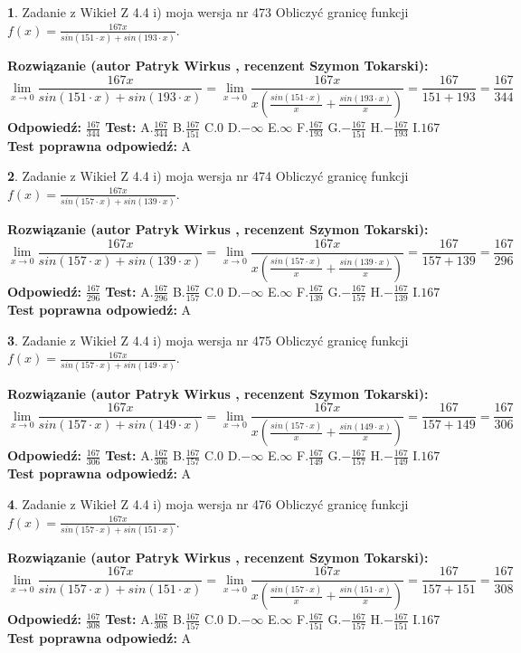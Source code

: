 \documentclass[12pt, a4paper]{article}
\theoremstyle{definition} %
\newtheorem{zad}{}
\newcommand{\zadStart}[1]{\begin{zad}#1\newline}
\newcommand{\zadStop}{\end{zad}}
\newcommand{\rozwStart}[2]{\noindent \textbf{Rozwiązanie (autor #1 , recenzent #2): }\newline}
\newcommand{\rozwStop}{\newline}
\newcommand{\odpStart}{\noindent \textbf{Odpowiedź:}\newline}
\newcommand{\odpStop}{\newline}
\newcommand{\testStart}{\noindent \textbf{Test:}\newline}
\newcommand{\testStop}{\newline}
\newcommand{\kluczStart}{\noindent \textbf{Test poprawna odpowiedź:}\newline}
\newcommand{\kluczStop}{\newline}
\begin{document}
\zadStart{Zadanie z Wikieł Z 4.4 i) moja wersja nr 473}
Obliczyć granicę funkcji $f(x)=\frac{167x}{sin(151\cdot x) +sin(193\cdot x)}$.
\zadStop
\rozwStart{Patryk Wirkus}{Szymon Tokarski}
$$\lim\limits_{x\to 0}\frac{167x}{sin(151\cdot x) +sin(193\cdot x)}=\lim\limits_{x\to 0}\frac{167x}{x(\frac{sin(151\cdot x)}{x}+\frac{sin(193\cdot x)}{x})}=\frac{167}{151+193} = \frac{167}{344}$$
\rozwStop
\odpStart
$\frac{167}{344}$
\odpStop
\testStart
A.$\frac{167}{344}$
B.$\frac{167}{151}$
C.$0$
D.$-\infty$
E.$\infty$
F.$\frac{167}{193}$
G.$-\frac{167}{151}$
H.$-\frac{167}{193}$
I.$167$
\testStop
\kluczStart
A
\kluczStop



\zadStart{Zadanie z Wikieł Z 4.4 i) moja wersja nr 474}
Obliczyć granicę funkcji $f(x)=\frac{167x}{sin(157\cdot x) +sin(139\cdot x)}$.
\zadStop
\rozwStart{Patryk Wirkus}{Szymon Tokarski}
$$\lim\limits_{x\to 0}\frac{167x}{sin(157\cdot x) +sin(139\cdot x)}=\lim\limits_{x\to 0}\frac{167x}{x(\frac{sin(157\cdot x)}{x}+\frac{sin(139\cdot x)}{x})}=\frac{167}{157+139} = \frac{167}{296}$$
\rozwStop
\odpStart
$\frac{167}{296}$
\odpStop
\testStart
A.$\frac{167}{296}$
B.$\frac{167}{157}$
C.$0$
D.$-\infty$
E.$\infty$
F.$\frac{167}{139}$
G.$-\frac{167}{157}$
H.$-\frac{167}{139}$
I.$167$
\testStop
\kluczStart
A
\kluczStop



\zadStart{Zadanie z Wikieł Z 4.4 i) moja wersja nr 475}
Obliczyć granicę funkcji $f(x)=\frac{167x}{sin(157\cdot x) +sin(149\cdot x)}$.
\zadStop
\rozwStart{Patryk Wirkus}{Szymon Tokarski}
$$\lim\limits_{x\to 0}\frac{167x}{sin(157\cdot x) +sin(149\cdot x)}=\lim\limits_{x\to 0}\frac{167x}{x(\frac{sin(157\cdot x)}{x}+\frac{sin(149\cdot x)}{x})}=\frac{167}{157+149} = \frac{167}{306}$$
\rozwStop
\odpStart
$\frac{167}{306}$
\odpStop
\testStart
A.$\frac{167}{306}$
B.$\frac{167}{157}$
C.$0$
D.$-\infty$
E.$\infty$
F.$\frac{167}{149}$
G.$-\frac{167}{157}$
H.$-\frac{167}{149}$
I.$167$
\testStop
\kluczStart
A
\kluczStop



\zadStart{Zadanie z Wikieł Z 4.4 i) moja wersja nr 476}
Obliczyć granicę funkcji $f(x)=\frac{167x}{sin(157\cdot x) +sin(151\cdot x)}$.
\zadStop
\rozwStart{Patryk Wirkus}{Szymon Tokarski}
$$\lim\limits_{x\to 0}\frac{167x}{sin(157\cdot x) +sin(151\cdot x)}=\lim\limits_{x\to 0}\frac{167x}{x(\frac{sin(157\cdot x)}{x}+\frac{sin(151\cdot x)}{x})}=\frac{167}{157+151} = \frac{167}{308}$$
\rozwStop
\odpStart
$\frac{167}{308}$
\odpStop
\testStart
A.$\frac{167}{308}$
B.$\frac{167}{157}$
C.$0$
D.$-\infty$
E.$\infty$
F.$\frac{167}{151}$
G.$-\frac{167}{157}$
H.$-\frac{167}{151}$
I.$167$
\testStop
\kluczStart
A
\kluczStop
\end{document}
